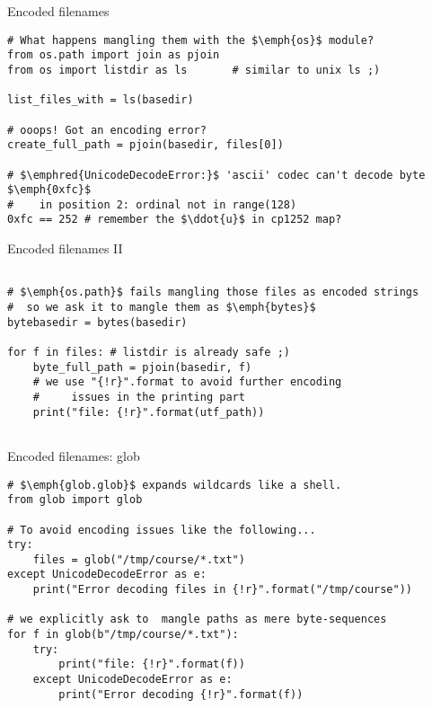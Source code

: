 \begin{frame}[fragile]{Encoded filenames}
\begin{verbatim}
# What happens mangling them with the $\emph{os}$ module?
from os.path import join as pjoin
from os import listdir as ls       # similar to unix ls ;)

list_files_with = ls(basedir)

# ooops! Got an encoding error?
create_full_path = pjoin(basedir, files[0])

# $\emphred{UnicodeDecodeError:}$ 'ascii' codec can't decode byte $\emph{0xfc}$
#    in position 2: ordinal not in range(128)
0xfc == 252 # remember the $\ddot{u}$ in cp1252 map? 
\end{verbatim}
\end{frame}

\begin{frame}[fragile]{Encoded filenames II}
\begin{verbatim}

# $\emph{os.path}$ fails mangling those files as encoded strings
#  so we ask it to mangle them as $\emph{bytes}$
bytebasedir = bytes(basedir)

for f in files: # listdir is already safe ;)
    byte_full_path = pjoin(basedir, f)
    # we use "{!r}".format to avoid further encoding
    #     issues in the printing part
    print("file: {!r}".format(utf_path))
    
\end{verbatim}
\end{frame}

\begin{frame}[fragile]{Encoded filenames: glob}
\begin{verbatim}
# $\emph{glob.glob}$ expands wildcards like a shell. 
from glob import glob

# To avoid encoding issues like the following...
try:
    files = glob("/tmp/course/*.txt")
except UnicodeDecodeError as e:
    print("Error decoding files in {!r}".format("/tmp/course"))

# we explicitly ask to  mangle paths as mere byte-sequences
for f in glob(b"/tmp/course/*.txt"):
    try:
        print("file: {!r}".format(f))
    except UnicodeDecodeError as e:
        print("Error decoding {!r}".format(f))

\end{verbatim}
\end{frame}


